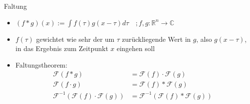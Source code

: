 \begin{frame}{Faltung}
	\begin{itemize}
		\item $(f * g)(x) := {\displaystyle \int} f(\tau)g(x-\tau) d\tau \quad; f,g: \mathbb{R}^n \rightarrow \mathbb{C}$ \vspace{0.5em}
		\item $f(\tau)$ gewichtet wie sehr der um $\tau$ zurückliegende Wert in $g$, also $g(x-\tau)$, in das Ergebnis zum Zeitpunkt $x$ eingehen soll \vspace{0.5em}
		\item Faltungstheorem:  \begin{align*}
			\mathcal{F}(f * g) & = \mathcal{F}(f) \cdot \mathcal{F}(g) \\
			\mathcal{F}(f \cdot g) & = \mathcal{F}(f) * \mathcal{F}(g) \\
			\mathcal{F}^{-1}(\mathcal{F}(f) \cdot \mathcal{F}(g)) & = \mathcal{F}^{-1}(\mathcal{F}(f) * \mathcal{F}(g))
		\end{align*}
	\end{itemize}
	
\end{frame}


